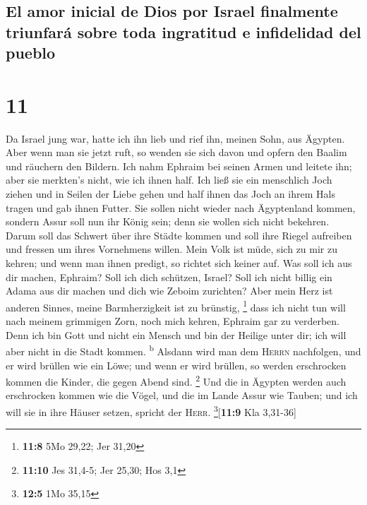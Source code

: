 \hypertarget{el-amor-inicial-de-dios-por-israel-finalmente-triunfaruxe1-sobre-toda-ingratitud-e-infidelidad-del-pueblo}{%
\subsection{El amor inicial de Dios por Israel finalmente triunfará
sobre toda ingratitud e infidelidad del
pueblo}\label{el-amor-inicial-de-dios-por-israel-finalmente-triunfaruxe1-sobre-toda-ingratitud-e-infidelidad-del-pueblo}}

\hypertarget{section-10}{%
\section{11}\label{section-10}}

 Da Israel jung war, hatte ich ihn lieb und rief ihn,
meinen Sohn, aus Ägypten.  Aber wenn man sie jetzt ruft,
so wenden sie sich davon und opfern den Baalim und räuchern den Bildern.
 Ich nahm Ephraim bei seinen Armen und leitete ihn; aber
sie merkten's nicht, wie ich ihnen half.  Ich ließ sie ein
menschlich Joch ziehen und in Seilen der Liebe gehen und half ihnen das
Joch an ihrem Hals tragen und gab ihnen Futter.  Sie
sollen nicht wieder nach Ägyptenland kommen, sondern Assur soll nun ihr
König sein; denn sie wollen sich nicht bekehren.  Darum
soll das Schwert über ihre Städte kommen und soll ihre Riegel aufreiben
und fressen um ihres Vornehmens willen.  Mein Volk ist
müde, sich zu mir zu kehren; und wenn man ihnen predigt, so richtet sich
keiner auf.  Was soll ich aus dir machen, Ephraim? Soll
ich dich schützen, Israel? Soll ich nicht billig ein Adama aus dir
machen und dich wie Zeboim zurichten? Aber mein Herz ist anderen Sinnes,
meine Barmherzigkeit ist zu brünstig, \footnote{\textbf{11:8} 5Mo 29,22;
  Jer 31,20}  dass ich nicht tun will nach meinem
grimmigen Zorn, noch mich kehren, Ephraim gar zu verderben. Denn ich bin
Gott und nicht ein Mensch und bin der Heilige unter dir; ich will aber
nicht in die Stadt kommen. \textsuperscript{b}  Alsdann
wird man dem \textsc{Herrn} nachfolgen, und er wird brüllen wie ein
Löwe; und wenn er wird brüllen, so werden erschrocken kommen die Kinder,
die gegen Abend sind. \footnote{\textbf{11:10} Jes 31,4-5; Jer 25,30;
  Hos 3,1}  Und die in Ägypten werden auch erschrocken
kommen wie die Vögel, und die im Lande Assur wie Tauben; und ich will
sie in ihre Häuser setzen, spricht der \textsc{Herr}.
\footnote{\textbf{12:5} 1Mo 35,15}{[}\textbf{11:9} Kla 3,31-36{]}

